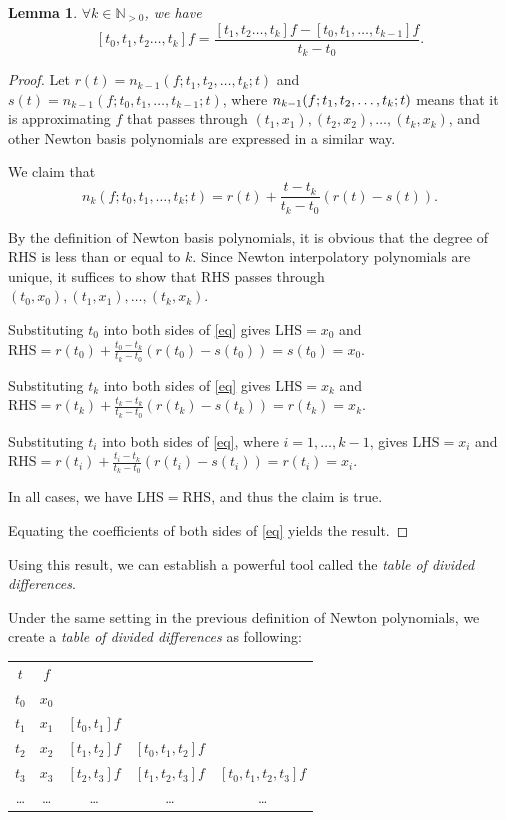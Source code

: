 \documentclass[a4paper,11pt,titlepage]{article}
\theoremstyle{definition}
\theoremstyle{plain}
\newtheorem{lemma}[theorem]{Lemma}
\theoremstyle{remark}
\begin{document}
\begin{lemma}\label{lemma62}
    $\forall k\in\mathbb{N}_{>0}$, we have $$[t_0,t_1,t_2\dots,t_k]f=\frac{[t_1,t_2\dots,t_k]f-[t_0,t_1,\dots,t_{k-1}]f}{t_k-t_0}.$$
\end{lemma}
\begin{proof}
    Let $r(t)=n_{k-1}(f;t_1,t_2,\dots,t_k;t)$ and $s(t)=n_{k-1}(f;t_0,t_1,\dots,t_{k-1};t)$, where $n_{k-1}(f;\\t_1,t_2,\dots,t_k;t)$ means that it is approximating $f$ that passes through $(t_1,x_1), (t_2,x_2), \dots, (t_k,x_k)$, and other Newton basis polynomials are expressed in a similar way.
    
    We claim that
    \begin{equation}\label{eq}
        n_k(f;t_0,t_1,\dots,t_k;t)=r(t)+\frac{t-t_k}{t_k-t_0}(r(t)-s(t)).\tag{*}
    \end{equation}

    By the definition of Newton basis polynomials, it is obvious that the degree of $\mathrm{RHS}$ is less than or equal to $k$. Since Newton interpolatory polynomials are unique, it suffices to show that $\mathrm{RHS}$ passes through $(t_0,x_0), (t_1,x_1), \dots, (t_k,x_k)$.
    
    Substituting $t_0$ into both sides of \ref{eq} gives $\mathrm{LHS}=x_0$ and $\mathrm{RHS}=r(t_0)+\frac{t_0-t_k}{t_k-t_0}(r(t_0)-s(t_0))=s(t_0)=x_0.$

    Substituting $t_k$ into both sides of \ref{eq} gives $\mathrm{LHS}=x_k$ and $\mathrm{RHS}=r(t_k)+\frac{t_k-t_k}{t_k-t_0}(r(t_k)-s(t_k))=r(t_k)=x_k.$

    Substituting $t_i$ into both sides of \ref{eq}, where $i=1,\dots,k-1$, gives $\mathrm{LHS}=x_i$ and $\mathrm{RHS}=r(t_i)+\frac{t_i-t_k}{t_k-t_0}(r(t_i)-s(t_i))=r(t_i)=x_i.$

    In all cases, we have $\mathrm{LHS} = \mathrm{RHS}$, and thus the claim is true.

    Equating the coefficients of both sides of \ref{eq} yields the result.\cite{Gautschi2012}
\end{proof}

Using this result, we can establish a powerful tool called the \textit{table of divided differences}.

 Under the same setting in the previous definition of Newton polynomials, we create a \textit{table of divided differences} as following:

\begin{center}
\begin{tabular}{ c c c c c }
 $t$ & $f$ & & & \\ 
 $t_0$ & $x_0$ & & & \\  
 $t_1$ & $x_1$ & $[t_0,t_1]f$ & & \\
 $t_2$ & $x_2$ & $[t_1,t_2]f$ & $[t_0,t_1,t_2]f$ & \\
 $t_3$ & $x_3$ & $[t_2,t_3]f$ & $[t_1,t_2,t_3]f$ &  $[t_0,t_1,t_2,t_3]f$ \\
 \dots & \dots & \dots & \dots & \dots
\end{tabular}
\end{center}
\end{document}
